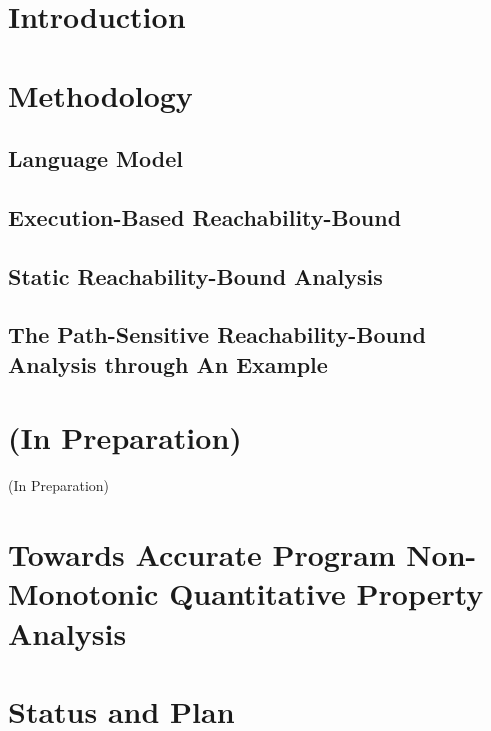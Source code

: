 \documentclass[a4paper,11pt]{article}
\begin{document}
\section{Introduction}
\label{sec:reachability-intro}


\section{Methodology}
\label{sec:reachability-analysis}

\subsection{{Language Model}}
\label{sec:language}

\subsection{{Execution-Based Reachability-Bound}}
\label{sec:reachability-exe}

\subsection{{Static Reachability-Bound Analysis}}
\label{sec:reachability-static}


\subsection{The Path-Sensitive Reachability-Bound Analysis through An Example}
\label{sec:reachability-example}


\section*{(In Preparation)}
{\protect\numberline{}(In Preparation)}%

\section{Towards Accurate Program Non-Monotonic Quantitative Property Analysis }
\label{sec:generalization}


% 

\section{Status and Plan }
\label{sec:status-plan}




\end{document}
